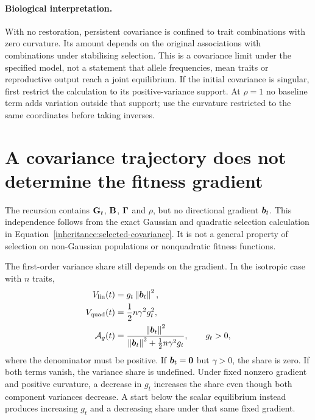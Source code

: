 \paragraph{Biological interpretation.}
With no restoration, persistent covariance is confined to trait
combinations with zero curvature. Its amount depends on the original
associations with combinations under stabilising selection. This is a
covariance limit under the specified model, not a statement that allele
frequencies, mean traits or reproductive output reach a joint equilibrium.
If the initial covariance is singular, first restrict the calculation to
its positive-variance support. At $\rho=1$ no baseline term adds variation
outside that support; use the curvature restricted to the same coordinates
before taking inverses.

\section{A covariance trajectory does not determine the fitness gradient}
\label{inheritance:gradient-and-share}

The recursion contains $\mathbf{G}_t$, $\mathbf{B}$, $\boldsymbol{\Gamma}$ and $\rho$, but no
directional gradient $\boldsymbol{b}_t$. This independence follows from the
exact Gaussian and quadratic selection calculation in
Equation~\eqref{inheritance:selected-covariance}. It is not a general
property of selection on non-Gaussian populations or nonquadratic fitness
functions.

The first-order variance share still depends on the gradient. In the
isotropic case with $n$ traits,
\begin{align}
  V_{\mathrm{lin}}(t)&=g_t\left\lVert \boldsymbol{b}_t\right\rVert^{2},\\
  V_{\mathrm{quad}}(t)&=\frac12 n\gamma^2g_t^2,\\
  \mathcal A_g(t)&=\frac{\left\lVert \boldsymbol{b}_t\right\rVert^{2}}
                   {\left\lVert \boldsymbol{b}_t\right\rVert^{2}+\tfrac12n\gamma^2g_t},
                   \qquad g_t>0,
  \label{inheritance:isotropic-share}
\end{align}
where the denominator must be positive. If $\boldsymbol{b}_t=\boldsymbol{0}$ but
$\gamma>0$, the share is zero. If both terms vanish, the variance share
is undefined. Under fixed nonzero gradient and positive curvature, a
decrease in $g_t$ increases the share even though both component variances
decrease. A start below the scalar equilibrium instead produces increasing
$g_t$ and a decreasing share under that same fixed gradient.

